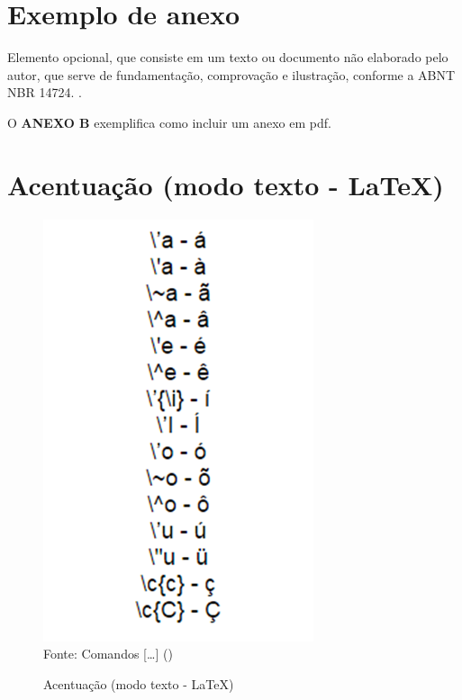 \begin{anexosenv}

\partanexos

\chapter{Exemplo de anexo}
Elemento opcional, que consiste em um texto ou documento não elaborado pelo autor, que serve de fundamentação, comprovação e ilustração, conforme a ABNT NBR 14724. \cite{nbr14724}.

O \textbf{ANEXO B} exemplifica como incluir um anexo em pdf.

\chapter{Acentuação (modo texto - \LaTeX)}
\begin{figure}[H]
	\begin{center}
	\caption{\label{fig_anexob}Acentuação (modo texto - \LaTeX)}
	\includegraphics[scale=1.0]{USPSC-img/USPSC-AcentuacaoLaTeX.png} \\
	Fonte: Comandos [\ldots]  (\citeyear{comandos})
	\end{center}	
\end{figure}

\end{anexosenv}
